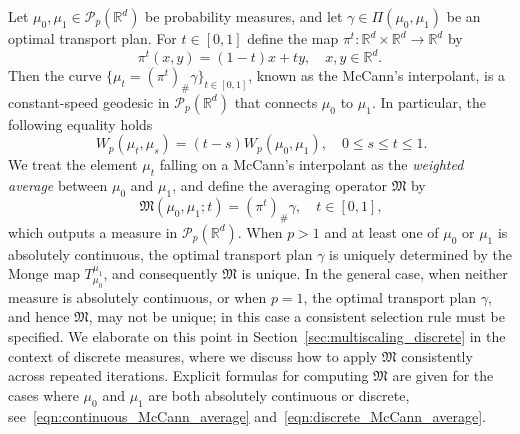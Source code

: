 \documentclass[12pt]{amsart}
\begin{document}
Let $\mu_0, \mu_1\in\mathcal{P}_p(\mathbb{R}^d)$ be probability measures, and let $\gamma\in\Pi(\mu_0, \mu_1)$ be an optimal transport plan. For $t\in[0,1]$ define the map $\pi^t:\mathbb{R}^d\times\mathbb{R}^d\rightarrow\mathbb{R}^d$ by
\begin{equation}
    \pi^t(x,y) = (1-t)x+ty, \quad x,y\in\mathbb{R}^d.
\end{equation}
Then the curve $\{\mu_t=(\pi^t)_{\#}\gamma\}_{t\in[0,1]}$, known as the McCann's interpolant, is a constant-speed geodesic in $\mathcal{P}_p(\mathbb{R}^d)$ that connects $\mu_0$ to $\mu_1$. In particular, the following equality holds
\begin{equation}~\label{eqn:constant_speed}
    W_p(\mu_t, \mu_s) = (t-s)W_p(\mu_0, \mu_1), \quad 0\leq s\leq t\leq 1.
\end{equation}
We treat the element $\mu_t$ falling on a McCann's interpolant as the \emph{weighted average} between $\mu_0$ and $\mu_1$, and define the averaging operator $\mathfrak{M}$ by
\begin{equation}~\label{eqn:McCann_average}
    \mathfrak{M}(\mu_0, \mu_1; t) = (\pi^t)_{\#}\gamma, \quad t\in[0, 1],
\end{equation}
which outputs a measure in $\mathcal{P}_p(\mathbb{R}^d)$. When $p>1$ and at least one of $\mu_0$ or $\mu_1$ is absolutely continuous, the optimal transport plan $\gamma$ is uniquely determined by the Monge map $T_{\mu_0}^{\mu_1}$, and consequently $\mathfrak{M}$ is unique. In the general case, when neither measure is absolutely continuous, or when $p=1$, the optimal transport plan $\gamma$, and hence $\mathfrak{M}$, may not be unique; in this case a consistent selection rule must be specified. We elaborate on this point in Section~\ref{sec:multiscaling_discrete} in the context of discrete measures, where we discuss how to apply $\mathfrak{M}$ consistently across repeated iterations. Explicit formulas for computing $\mathfrak{M}$ are given for the cases where $\mu_0$ and $\mu_1$ are both absolutely continuous or discrete, see~\eqref{eqn:continuous_McCann_average} and~\eqref{eqn:discrete_McCann_average}.
\end{document}
